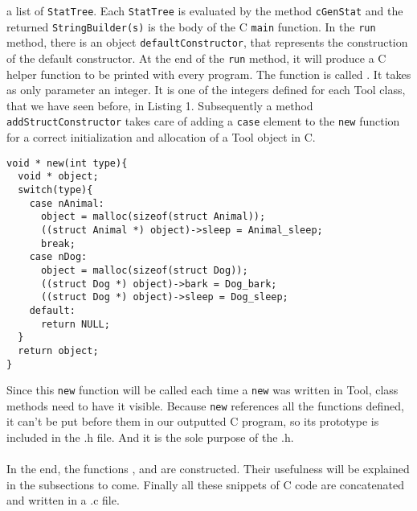 a list of {\lstinline[basicstyle=\small\ttfamily]|StatTree|}.
Each {\lstinline[basicstyle=\small\ttfamily]|StatTree|} is evaluated
by the method {\lstinline[basicstyle=\small\ttfamily]|cGenStat|} and
the returned {\lstinline[basicstyle=\small\ttfamily]|StringBuilder(s)|}
is the body of the C {\lstinline[basicstyle=\small\ttfamily]|main|} function.
\newline
In the {\lstinline[basicstyle=\small\ttfamily]|run|} method, there is
an object
\newline
{\lstinline[basicstyle=\small\ttfamily]|defaultConstructor|},
that represents the construction of the default constructor. At the end of the {\lstinline[basicstyle=\small\ttfamily]|run|} method, it will produce a C helper function to be printed with every program. The function is called
\lstset{style=customc}{\lstinline[basicstyle=\small\ttfamily]|new|}.
It takes as only parameter an integer. It is one of the integers defined for each Tool class,
that we have seen before, in Listing 1.
Subsequently a method {\lstinline[basicstyle=\small\ttfamily]|addStructConstructor|}
takes care of adding a {\lstinline[basicstyle=\small\ttfamily]|case|} element
to the {\lstinline[basicstyle=\small\ttfamily]|new|} function for a correct
initialization and allocation of a Tool object in C.
\begin{lstlisting}[caption={In the case of the example used in the section 2.}, captionpos=b]
void * new(int type){
  void * object;
  switch(type){
    case nAnimal:
      object = malloc(sizeof(struct Animal));
      ((struct Animal *) object)->sleep = Animal_sleep;
      break;
    case nDog:
      object = malloc(sizeof(struct Dog));
      ((struct Dog *) object)->bark = Dog_bark;
      ((struct Dog *) object)->sleep = Dog_sleep;
    default:
      return NULL;
  }
  return object;
}
\end{lstlisting}
Since this {\lstinline[basicstyle=\small\ttfamily]|new|} function will be called each time a {\lstinline[basicstyle=\small\ttfamily]|new|} was written in Tool, class methods need to have it visible. Because {\lstinline[basicstyle=\small\ttfamily]|new|} references all the functions defined, it can't be put before them in our outputted C program, so its prototype is included in the .h file. And it is the sole purpose of the .h.\\\\
In the end, the functions
\newline
\lstset{style=customc}{\lstinline[basicstyle=\small\ttfamily]|void helper_reverse_plus(char str[], int len)|},
\lstset{style=customc}{\lstinline[basicstyle=\small\ttfamily]|char* itoa(int num)|} and
\lstset{style=customc}{\lstinline[basicstyle=\small\ttfamily]|int * arrayAlloc(int size)|} are constructed.
Their usefulness will be explained in the subsections to come.
\newline
Finally all these snippets of C code are concatenated and written in a .c file.
\newline
